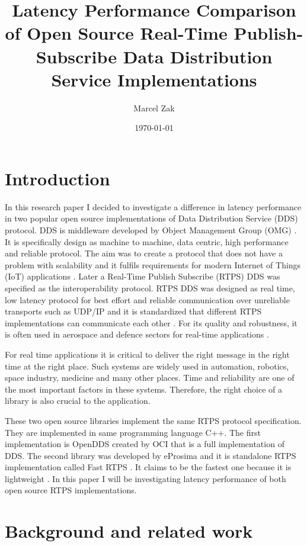 \documentclass{csfourzero}
\title{Latency Performance Comparison of Open Source Real-Time Publish-Subscribe Data Distribution Service Implementations}
\author{Marcel Zak}
\date{\today}
\begin{document}
\maketitle


\section{Introduction}
\label{sec:intro}

\quad In this research paper I decided to investigate a difference in latency performance in two popular open source implementations of Data Distribution Service (DDS) protocol. DDS is middleware developed by Object Management Group (OMG) \cite{what-is-dds}. It is specifically design as machine to machine, data centric, high performance and reliable protocol. The aim was to create a protocol that does not have a problem with scalability and it fulfils requirements for modern Internet of Things (IoT) applications \cite{DDS-spec}. Later a Real-Time Publish Subscribe (RTPS) DDS was specified as the interoperability protocol. RTPS DDS was designed as real time, low latency protocol for best effort and reliable communication over unreliable transports such as UDP/IP and it is standardized that different RTPS implementations can communicate each other \cite{RTPS-spec}. For its quality and robustness, it is often used in aerospace and defence sectors for real-time applications \cite{eprosima-rtps-intro}. 

For real time applications it is critical to deliver the right message in the right time at the right place. Such systems are widely used in automation, robotics, space industry, medicine and many other places. Time and reliability are one of the most important factors in these systems. Therefore, the right choice of a library is also crucial to the application. 

These two open source libraries implement the same RTPS protocol specification. They are implemented in same programming language C++. The first implementation is OpenDDS \cite{git-openDDS} created by OCI that is a full implementation of DDS. The second library was developed by eProsima and it is standalone RTPS implementation called Fast RTPS \cite{git-eProsima}. It claims to be the fastest one because it is lightweight \cite{eprosima-rtps-intro}. In this paper I will be investigating latency performance of both open source RTPS implementations.

\section{Background and related work}
\label{sec:lit}
\end{document}
